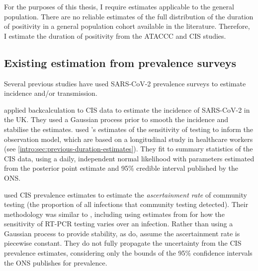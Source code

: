 \documentclass[thesis.tex]{subfiles}
\begin{document}
For the purposes of this thesis, I require estimates applicable to the general population.
There are no reliable estimates of the full distribution of the duration of positivity in a general population cohort available in the literature.
Therefore, I estimate the duration of positivity from the ATACCC and CIS studies.


\subsection{Existing estimation from prevalence surveys}

Several previous studies have used SARS-CoV-2 prevalence surveys to estimate incidence and/or transmission.

\Textcite{abbottCISincidence} applied backcalculation to CIS data to estimate the incidence of SARS-CoV-2 in the UK.
They used a Gaussian process prior to smooth the incidence and stabilise the estimates.
\Textcite{abbottCISincidence} used \textcite{hellewellPCRSensitivity}'s estimates of the sensitivity of testing to inform the observation model, which are based on a longitudinal study in healthcare workers (see \cref{intro:sec:previous-duration-estimates}).
They fit to summary statistics of the CIS data, using a daily, independent normal likelihood with parameters estimated from the posterior point estimate and 95\% credible interval published by the ONS.

\Textcite{colmanAscertainment} used CIS prevalence estimates to estimate the \emph{ascertainment rate} of community testing (the proportion of all infections that community testing detected).
Their methodology was similar to \textcite{abbottCISincidence}, including using estimates from \textcite{hellewellPCRSensitivity} for how the sensitivity of RT-PCR testing varies over an infection.
Rather than using a Gaussian process to provide stability, as \textcite{abbottCISincidence} do, \textcite{colmanAscertainment} assume the ascertainment rate is piecewise constant.
They do not fully propagate the uncertainty from the CIS prevalence estimates, considering only the bounds of the 95\% confidence intervals the ONS publishes for prevalence.
\end{document}
